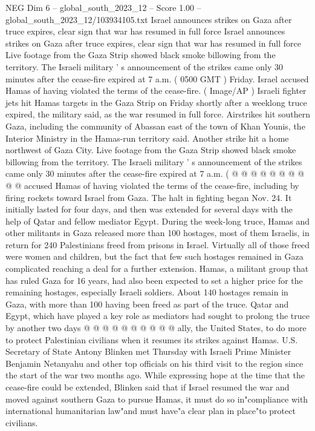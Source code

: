 \begin{textsample}{NEG Dim 6 – global\_south\_2023\_12 – Score 1.00 – global\_south\_2023\_12/103934105.txt}  \label{ex:f6_neg_356}
Israel announces strikes on Gaza after truce expires, clear sign that war has resumed in full force Israel announces strikes on Gaza after truce expires, clear sign that war has resumed in full force Live footage from the Gaza Strip showed black smoke billowing from the territory.
The Israeli military ' s announcement of the strikes came only 30 minutes after the cease-fire expired at 7 a.m. ( 0500 GMT ) Friday.
Israel accused Hamas of having violated the terms of the cease-fire. ( Image/AP ) Israeli fighter jets hit Hamas targets in the Gaza Strip on Friday shortly after a weeklong truce expired, the military said, as the war resumed in full force.
Airstrikes hit southern Gaza, including the community of Abassan east of the town of Khan Younis, the Interior Ministry in the Hamas-run territory said.
Another strike hit a home northwest of Gaza City.
Live footage from the Gaza Strip showed black smoke billowing from the territory.
The Israeli military ' s announcement of the strikes came only 30 minutes after the cease-fire expired at 7 a.m. ( @ @ @ @ @ @ @ @ @ @ accused Hamas of having violated the terms of the cease-fire, including by firing rockets toward Israel from Gaza.
The halt in fighting began Nov. 24.
It initially lasted for four days, and then was extended for several days with the help of Qatar and fellow mediator Egypt.
During the week-long truce, Hamas and other militants in Gaza released more than 100 hostages, most of them Israelis, in return for 240 Palestinians freed from prisons in Israel.
Virtually all of those freed were women and children, but the fact that few such hostages remained in Gaza complicated reaching a deal for a further extension.
Hamas, a militant group that has ruled Gaza for 16 years, had also been expected to set a higher price for the remaining hostages, especially Israeli soldiers.
About 140 hostages remain in Gaza, with more than 100 having been freed as part of the truce.
Qatar and Egypt, which have played a key role as mediators had sought to prolong the truce by another two days @ @ @ @ @ @ @ @ @ @ ally, the United States, to do more to protect Palestinian civilians when it resumes its strikes against Hamas.
U.S.
Secretary of State Antony Blinken met Thursday with Israeli Prime Minister Benjamin Netanyahu and other top officials on his third visit to the region since the start of the war two months ago.
While expressing hope at the time that the cease-fire could be extended, Blinken said that if Israel resumed the war and moved against southern Gaza to pursue Hamas, it must do so in"compliance with international humanitarian law"and must have"a clear plan in place"to protect civilians.

\end{textsample}
